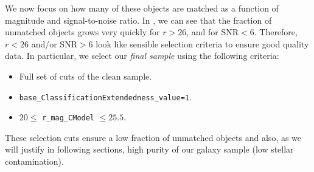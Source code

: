 \documentclass[\docopts]{\docclass}
\begin{document}

We now focus on how many of these objects are matched as a function of magnitude and signal-to-noise ratio. In , we can see that the fraction of unmatched objects grows very quickly for $r > 26$, and for SNR$<6$. Therefore, $r < 26$ and/or SNR$>6$ look like sensible selection criteria to ensure good quality data. In particular, we select our \textit{final sample} using the following criteria:

\begin{itemize}
\item Full set of cuts of the clean sample.
\item \texttt{base\_ClassificationExtendedness\_value=1}.
\item $20 \leq$ \texttt{r\_mag\_CModel} $\leq 25.5$. 
\end{itemize}

These selection cuts ensure a low fraction of unmatched objects and also, as we will justify in following sections, high purity of our galaxy sample (low stellar contamination).
\end{document}
